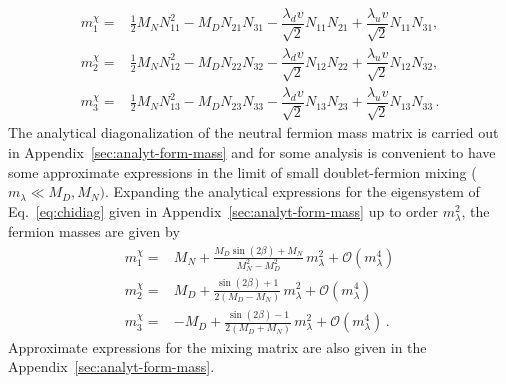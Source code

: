 \begin{align}
\label{eq:masses_diag}
m^\chi_1=&\tfrac{1}{2}M_NN_{11}^2 - M_D N_{21}N_{31}-\dfrac{\lambda_dv}{\sqrt{2}}N_{11}N_{21}+\dfrac{\lambda_uv}{\sqrt{2}}N_{11}N_{31},\\
m^\chi_2=&\tfrac{1}{2}M_NN_{12}^2 - M_D N_{22}N_{32}-\dfrac{\lambda_dv}{\sqrt{2}}N_{12}N_{22}+\dfrac{\lambda_uv}{\sqrt{2}}N_{12}N_{32},\\
m^\chi_3=&\tfrac{1}{2}M_NN_{13}^2 - M_D N_{23}N_{33}-\dfrac{\lambda_dv}{\sqrt{2}}N_{13}N_{23}+\dfrac{\lambda_uv}{\sqrt{2}}N_{13}N_{33}\,.
\end{align}
%
The analytical diagonalization of the neutral fermion mass matrix is
carried out in Appendix~\ref{sec:analyt-form-mass} 
and for some analysis is convenient to have some approximate expressions in
the limit of small doublet-fermion mixing ($m_\lambda\ll M_D,M_N)$.
Expanding the analytical expressions for the eigensystem of
Eq.~\eqref{eq:chidiag} given in Appendix~\ref{sec:analyt-form-mass}
up to order $m_{\lambda}^2$, the fermion masses are given by
\begin{align}
\label{eq:ml2}
m^\chi_1=&M_{N} + \frac{M_{D} \sin{\left (2 \beta \right )} + M_{N}}{M_{N}^{2}- M_{D}^{2} }\, m_{\lambda}^{2}+\mathcal{O}\left( m_{\lambda}^4 \right) \nonumber\\
m^\chi_2=&M_{D} + \frac{ \sin(2 \beta ) + 1}{2 \left( M_{D} -  M_{N} \right)}\,m_{\lambda}^{2}+\mathcal{O}\left( m_{\lambda}^4 \right) \nonumber\\
m^\chi_3=&- M_{D} + \frac{ \sin(2 \beta ) - 1}{2 \left( M_{D} + M_{N} \right) }\,m_{\lambda}^{2}+\mathcal{O}\left( m_{\lambda}^4 \right)\,.
\end{align}
Approximate expressions for the mixing matrix are also given in the Appendix~\ref{sec:analyt-form-mass}.







